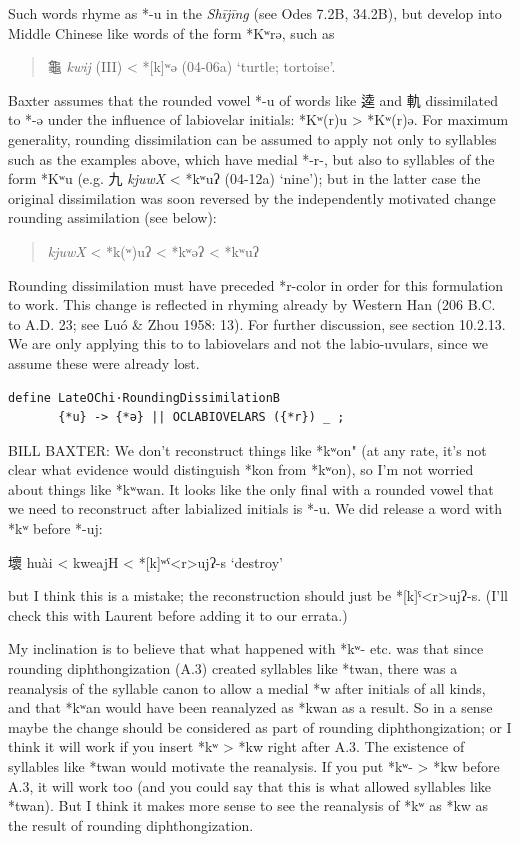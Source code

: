 \documentclass[xetex, svgnames, 12pt]{scrartcl}
\begin{document}
Such words rhyme as *-u in the \textit{Shījīng} (see Odes 7.2B, 34.2B), but develop into Middle
Chinese like words of the form *Kʷrə, such as
\begin{quote}

龜 %
\textit{kwij} (III) < *[k]ʷə (04-06a) `turtle; tortoise'.
\end{quote}
Baxter assumes that the rounded vowel *-u of words like 
逵 
and 軌 
dissimilated
to *-ə under the influence of labiovelar initials: *Kʷ(r)u > *Kʷ(r)ə. For maximum
generality, rounding dissimilation can be assumed to apply not only to syllables such as
the examples above, which have medial *-r-, but also to syllables of the form *Kʷu (e.g.
九 
\textit{kjuwX} < *kʷuʔ (04-12a) `nine'); but in the latter case the original dissimilation was soon reversed
by the independently motivated change rounding assimilation (see below):
\begin{quote}
\textit{kjuwX} < *k(ʷ)uʔ < *kʷəʔ < *kʷuʔ
\end{quote}

Rounding dissimilation must have preceded *r-color in order for this formulation to work.
This change is reflected in rhyming already by Western Han (206 B.C. to A.D. 23; 
see Luó \& Zhou 1958: 13). For further discussion, see section 10.2.13.
We are only applying this to to labiovelars and not the labio-uvulars, since we assume these were 
already lost. 
\begin{verbatim}
define LateOChi·RoundingDissimilationB 
       {*u} -> {*ə} || OCLABIOVELARS ({*r}) _ ;     
\end{verbatim}

BILL BAXTER: We don't reconstruct things like *kʷon" (at any rate, it's not clear what evidence would distinguish *kon from *kʷon), so I'm not worried about things like *kʷwan. It looks like the only final with a rounded vowel that we need to reconstruct after labialized initials is *-u. We did release a word with *kʷ before *-uj:

壞 huài < kweajH < *[k]ʷˤ<r>ujʔ-s ‘destroy’

but I think this is a mistake; the reconstruction should just be *[k]ˤ<r>ujʔ-s. (I'll check this with Laurent before adding it to our errata.)

My inclination is to believe that what happened with *kʷ- etc. was that since rounding diphthongization (A.3) created syllables like *twan, there was a reanalysis of the syllable canon to allow a medial *w after initials of all kinds, and that *kʷan would have been reanalyzed as *kwan as a result. So in a sense maybe the change should be considered as part of rounding diphthongization; or I think it will work if you insert *kʷ > *kw right after A.3. The existence of syllables like *twan would motivate the reanalysis. If you put *kʷ- > *kw before A.3, it will work too (and you could say that this is what allowed syllables like *twan). But I think it makes more sense to see the reanalysis of *kʷ as *kw as the result of rounding diphthongization.
\end{document}
